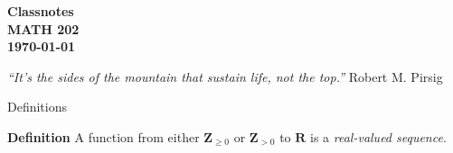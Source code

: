 \documentclass[portrait,fleqn,12pt]{beamer}
\newcommand{\reals}{\mathbf{R}}
\newcommand{\integers}{\mathbf{Z}}
\newenvironment{define}[1]{
  \textbf{Definition} #1}{}
\begin{document}
\begin{frame}
\small
\begin{flushleft} 
{ \bf
Classnotes \\
MATH 202 \\
\today }


\emph{“It's the sides of the mountain that sustain life, not the top.”} \hfill
{\sc Robert M. Pirsig} 
\end{flushleft}
\end{frame}


\begin{frame}{Definitions}


\begin{define} A function from either \(\integers_{\geq 0}\) or \(\integers_{> 0}\)
to \(\reals\) is a \emph{real-valued sequence}.
\end{define}
\vfill

\end{frame}
\end{document}

